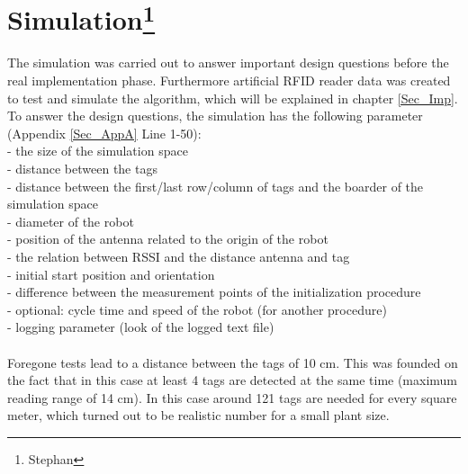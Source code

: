 \section[Simulation]{Simulation\footnote{Stephan}}
The simulation was carried out to answer important design questions before the real implementation phase. Furthermore artificial RFID reader data was created to test and simulate the algorithm, which will be explained in chapter \ref{Sec_Imp}. \\
To answer the design questions, the simulation has the following parameter (Appendix \ref{Sec_AppA} Line 1-50):\\
- the size of the simulation space\\
- distance between the tags\\
- distance between the first/last row/column of tags and the boarder of the simulation space\\
- diameter of the robot\\
- position of the antenna related to the origin of the robot\\
- the relation between RSSI and the distance antenna and tag\\
- initial start position and orientation\\
- difference between the measurement points of the initialization procedure\\
- optional: cycle time and speed of the robot (for another procedure)\\
- logging parameter (look of the logged text file)\\
\\
Foregone tests lead to a distance between the tags of 10 cm. This was founded on the fact that in this case at least 4 tags are detected at the same time (maximum reading range of 14 cm). In this case around 121 tags are needed for every square meter, which turned out to be realistic number for a small plant size. \\


